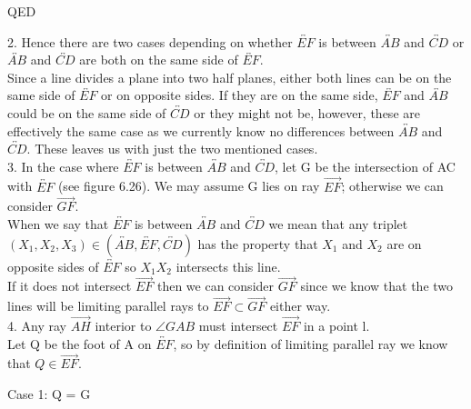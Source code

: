 \documentclass[12pt,letterpaper]{article}
\newcommand{\QED}{\begin{flushright}QED\end{flushright}}
\begin{document}
\QED




2. Hence there are two cases depending on whether $\overleftrightarrow{EF}$ is between $\overleftrightarrow{AB}$ and $\overleftrightarrow{CD}$ or $\overleftrightarrow{AB}$ and $\overleftrightarrow{CD}$ are both on the same side of $\overleftrightarrow{EF}$.\\

Since a line divides a plane into two half planes, either both lines can be on the same side of $\overleftrightarrow{EF}$ or on opposite sides.  If they are on the same side, $\overleftrightarrow{EF}$ and $\overleftrightarrow{AB}$ could be on the same side of $\overleftrightarrow{CD}$ or they might not be, however, these are effectively the same case as we currently know no differences between $\overleftrightarrow{AB}$ and $\overleftrightarrow{CD}$.  These leaves us with just the two mentioned cases.\\



3. In the case where $\overleftrightarrow{EF}$ is between $\overleftrightarrow{AB}$ and $\overleftrightarrow{CD}$, let G be the intersection of AC with $\overleftrightarrow{EF}$ (see figure 6.26).  We may assume G lies on ray $\overrightarrow{EF}$; otherwise we can consider $\overrightarrow{GF}$.\\

When we say that $\overleftrightarrow{EF}$ is between $\overleftrightarrow{AB}$ and $\overleftrightarrow{CD}$ we mean that any triplet $(X_1,X_2,X_3) \in (\overleftrightarrow{AB},\overleftrightarrow{EF},\overleftrightarrow{CD})$ has the property that $X_1$ and $X_2$ are on opposite sides of $\overleftrightarrow{EF}$ so $X_1 X_2$ intersects this line. \\

If it does not intersect $\overrightarrow{EF}$ then we can consider $\overrightarrow{GF}$ since we know that the two lines will be limiting parallel rays to $\overrightarrow{EF} \subset \overrightarrow{GF}$ either way.\\




4. Any ray $\overrightarrow{AH}$ interior to $\angle GAB$ must intersect $\overrightarrow{EF}$ in a point l.\\

Let Q be the foot of A on $\overleftrightarrow{EF}$, so by definition of limiting parallel ray we know that $Q \in \overrightarrow{EF}$.  

\noindent Case 1: Q = G\\
\end{document}
